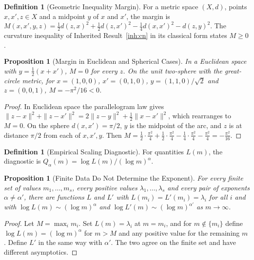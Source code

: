 \documentclass[11pt,letterpaper]{report}
\theoremstyle{plain}
\newtheorem{proposition}[theorem]{Proposition}
\theoremstyle{definition}
\newtheorem{definition}[theorem]{Definition}
\theoremstyle{remark}
\begin{document}
\begin{definition}[Geometric Inequality Margin]\label{def:margin}
For a metric space $(X,d)$, points $x,x',z\in X$ and a midpoint $y$ of $x$ and $x'$, the margin is $M(x,x',y,z)=\tfrac12d(z,x)^2+\tfrac12d(z,x')^2-\tfrac14d(x,x')^2-d(z,y)^2$. The curvature inequality of Inherited Result~\ref{inh:cn} in its classical form states $M\ge0$.
\end{definition}

\begin{proposition}[Margin in Euclidean and Spherical Cases]\label{pr:margin}
In a Euclidean space with $y=\tfrac12(x+x')$, $M=0$ for every $z$. On the unit two-sphere with the great-circle metric, for $x=(1,0,0)$, $x'=(0,1,0)$, $y=(1,1,0)/\sqrt2$ and $z=(0,0,1)$, $M=-\pi^2/16<0$.
\end{proposition}
\begin{proof}
In Euclidean space the parallelogram law gives $\|z-x\|^2+\|z-x'\|^2=2\|z-y\|^2+\tfrac12\|x-x'\|^2$, which rearranges to $M=0$. On the sphere $d(x,x')=\pi/2$, $y$ is the midpoint of the arc, and $z$ is at distance $\pi/2$ from each of $x,x',y$. Then $M=\tfrac12\cdot\tfrac{\pi^2}{4}+\tfrac12\cdot\tfrac{\pi^2}{4}-\tfrac14\cdot\tfrac{\pi^2}{4}-\tfrac{\pi^2}{4}=-\tfrac{\pi^2}{16}$.
\end{proof}

\begin{definition}[Empirical Scaling Diagnostic]\label{def:scalingdiag}
For quantities $L(m)$, the diagnostic is $Q_\alpha(m)=\log L(m)/(\log m)^\alpha$.
\end{definition}

\begin{proposition}[Finite Data Do Not Determine the Exponent]\label{pr:finitedata}
For every finite set of values $m_1,\dots,m_s$, every positive values $\lambda_1,\dots,\lambda_s$ and every pair of exponents $\alpha\ne\alpha'$, there are functions $L$ and $L'$ with $L(m_i)=L'(m_i)=\lambda_i$ for all $i$ and with $\log L(m)\sim(\log m)^\alpha$ and $\log L'(m)\sim(\log m)^{\alpha'}$ as $m\to\infty$.
\end{proposition}
\begin{proof}
Let $M=\max_im_i$. Set $L(m)=\lambda_i$ at $m=m_i$, and for $m\notin\{m_i\}$ define $\log L(m)=(\log m)^\alpha$ for $m>M$ and any positive value for the remaining $m$. Define $L'$ in the same way with $\alpha'$. The two agree on the finite set and have different asymptotics.
\end{proof}
\end{document}
